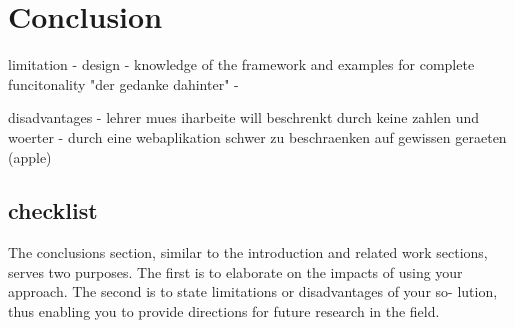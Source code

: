 
\chapter{Conclusion}
\label{chap:conclusion}

limitation
- design
- knowledge of the framework and examples for complete funcitonality "der gedanke dahinter"
-

disadvantages
- lehrer mues iharbeite will beschrenkt durch keine zahlen und woerter
- durch eine webaplikation schwer zu beschraenken auf gewissen geraeten (apple)


\section{checklist}
The conclusions section, similar to the introduction and
related work sections, serves two purposes. The first is
to elaborate on the impacts of using your approach. The
second is to state limitations or disadvantages of your so-
lution, thus enabling you to provide directions for future
research in the field.
